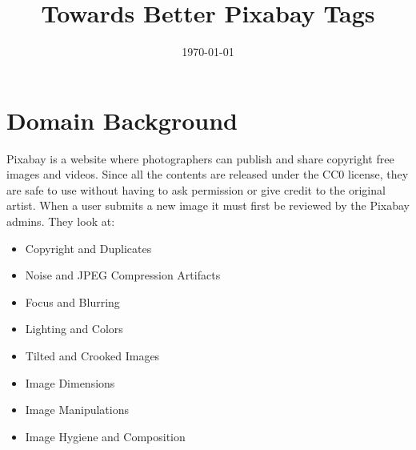 \documentclass[10pt, a4paper, twocolumn]{article} %
\title{Towards Better Pixabay Tags} %
\author{
	\authorstyle{Willie Maddox} %
}
\date{\today} %
\begin{document}
\maketitle %

\thispagestyle{firstpage} %




\section{Domain Background} %


Pixabay is a website where photographers can publish and share copyright free images and videos.  Since all the contents are released under the CC0 license, they are safe to use without having to ask permission or give credit to the original artist. When a user submits a new image it must first be reviewed by the Pixabay admins.  They look at: 

\begin{itemize}
	\item Copyright and Duplicates
	\item Noise and JPEG Compression Artifacts
	\item Focus and Blurring
	\item Lighting and Colors
	\item Tilted and Crooked Images
	\item Image Dimensions
	\item Image Manipulations
	\item Image Hygiene and Composition
\end{itemize}
\end{document}
